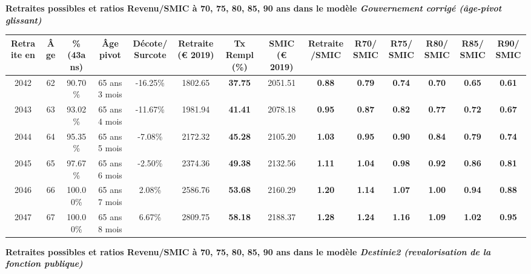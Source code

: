  \vspace{0.1cm} 
{\bf \noindent Retraites possibles et ratios Revenu/SMIC à 70, 75, 80, 85, 90 ans dans le modèle \emph{Gouvernement corrigé (âge-pivot glissant)}}  
 
\begin{adjustbox}{max width=\textwidth} 
\begin{tabular}[htb]{|c|c||c|c|c||c|c||c|c||c|c|c|c|c|} 
\hline 
 Retraite en &  Âge &  \%(43ans) &  Âge pivot &  Décote/Surcote &  Retraite (\euro{} 2019) &  Tx Rempl(\%) &  SMIC (\euro{} 2019) &  Retraite/SMIC &  R70/SMIC &  R75/SMIC &  R80/SMIC &  R85/SMIC &  R90/SMIC \\ 
\hline \hline 
 2042 &  62 &  90.70\% &  65 ans 3 mois &  -16.25\% &  1802.65 &  {\bf 37.75} &  2051.51 &  {\bf {\color{red} 0.88}} &  {\bf {\color{red} 0.79}} &  {\bf {\color{red} 0.74}} &  {\bf {\color{red} 0.70}} &  {\bf {\color{red} 0.65}} &  {\bf {\color{red} 0.61}} \\ 
\hline 
 2043 &  63 &  93.02\% &  65 ans 4 mois &  -11.67\% &  1981.94 &  {\bf 41.41} &  2078.18 &  {\bf {\color{red} 0.95}} &  {\bf {\color{red} 0.87}} &  {\bf {\color{red} 0.82}} &  {\bf {\color{red} 0.77}} &  {\bf {\color{red} 0.72}} &  {\bf {\color{red} 0.67}} \\ 
\hline 
 2044 &  64 &  95.35\% &  65 ans 5 mois &  -7.08\% &  2172.32 &  {\bf 45.28} &  2105.20 &  {\bf 1.03} &  {\bf {\color{red} 0.95}} &  {\bf {\color{red} 0.90}} &  {\bf {\color{red} 0.84}} &  {\bf {\color{red} 0.79}} &  {\bf {\color{red} 0.74}} \\ 
\hline 
 2045 &  65 &  97.67\% &  65 ans 6 mois &  -2.50\% &  2374.36 &  {\bf 49.38} &  2132.56 &  {\bf 1.11} &  {\bf 1.04} &  {\bf {\color{red} 0.98}} &  {\bf {\color{red} 0.92}} &  {\bf {\color{red} 0.86}} &  {\bf {\color{red} 0.81}} \\ 
\hline 
 2046 &  66 &  100.00\% &  65 ans 7 mois &  2.08\% &  2586.76 &  {\bf 53.68} &  2160.29 &  {\bf 1.20} &  {\bf 1.14} &  {\bf 1.07} &  {\bf {\color{red} 1.00}} &  {\bf {\color{red} 0.94}} &  {\bf {\color{red} 0.88}} \\ 
\hline 
 2047 &  67 &  100.00\% &  65 ans 8 mois &  6.67\% &  2809.75 &  {\bf 58.18} &  2188.37 &  {\bf 1.28} &  {\bf 1.24} &  {\bf 1.16} &  {\bf 1.09} &  {\bf 1.02} &  {\bf {\color{red} 0.95}} \\ 
\hline 
\hline 
\end{tabular} 
\end{adjustbox} 
 
 \vspace{0.1cm} 
{\bf \noindent Retraites possibles et ratios Revenu/SMIC à 70, 75, 80, 85, 90 ans dans le modèle \emph{Destinie2 (revalorisation de la fonction publique)}}  
 
